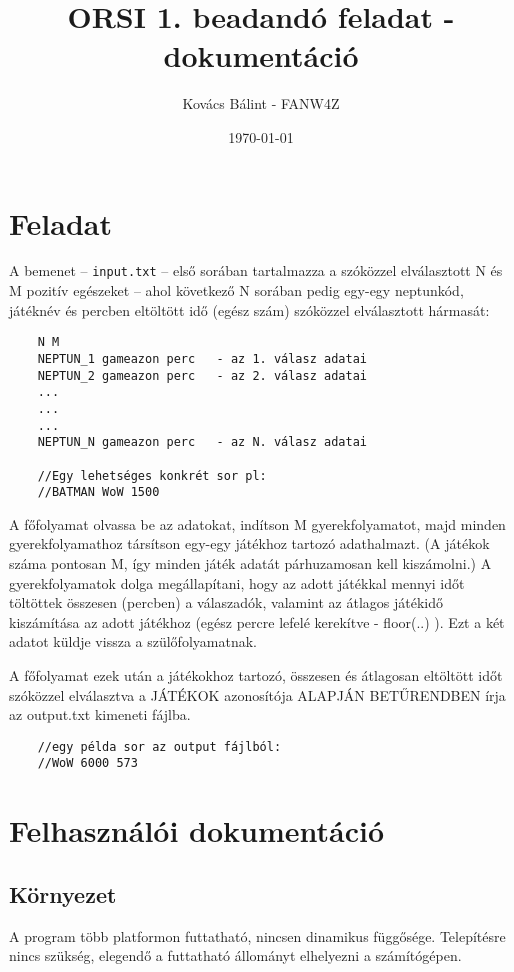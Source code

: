 \documentclass{article}
\begin{document}
	
	
	\title{ORSI 1. beadandó feladat - dokumentáció} 
	\author{Kovács Bálint - FANW4Z}  %
	\date{\today}  %
	\maketitle
	
	\section{Feladat}
	A bemenet -- \texttt{input.txt} -- első sorában tartalmazza a szóközzel elválasztott N és M pozitív egészeket -- ahol következő N sorában pedig egy-egy neptunkód, játéknév és percben eltöltött idő (egész szám) szóközzel elválasztott hármasát:
	
	\begin{verbatim}
	N M
	NEPTUN_1 gameazon perc   - az 1. válasz adatai
	NEPTUN_2 gameazon perc   - az 2. válasz adatai
	...
	...
	...
	NEPTUN_N gameazon perc   - az N. válasz adatai
	
	//Egy lehetséges konkrét sor pl:
	//BATMAN WoW 1500
	\end{verbatim}
	
	
	A főfolyamat olvassa be az adatokat, indítson M gyerekfolyamatot, majd minden gyerekfolyamathoz társítson egy-egy játékhoz tartozó adathalmazt. (A játékok száma pontosan M, így minden játék adatát párhuzamosan kell kiszámolni.) A gyerekfolyamatok dolga megállapítani, hogy az adott játékkal mennyi időt töltöttek összesen (percben) a válaszadók, valamint az átlagos játékidő kiszámítása az adott játékhoz (egész percre lefelé kerekítve - floor(..) ). Ezt a két adatot küldje vissza a szülőfolyamatnak.
	
	A főfolyamat ezek után a játékokhoz tartozó, összesen és átlagosan eltöltött időt szóközzel elválasztva a JÁTÉKOK azonosítója ALAPJÁN BETŰRENDBEN írja az output.txt kimeneti fájlba.
	
	\begin{verbatim}
	//egy példa sor az output fájlból:
	//WoW 6000 573
	\end{verbatim}
	
	\section{Felhasználói dokumentáció}
	
	\subsection{Környezet}
	A program több platformon futtatható, nincsen dinamikus függősége. Telepítésre
	nincs szükség, elegendő a futtatható állományt elhelyezni a számítógépen.
\end{document}
